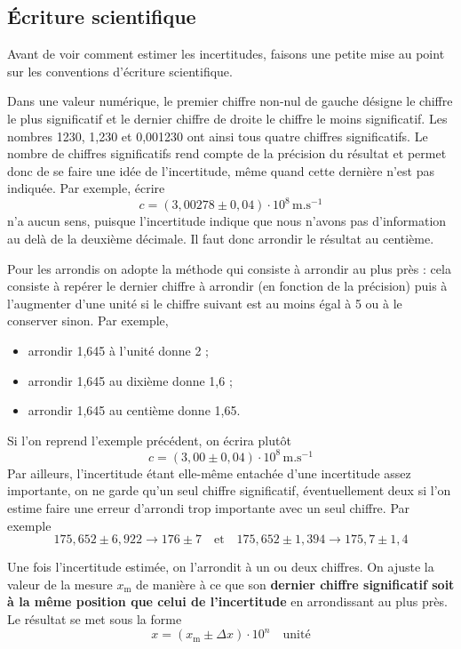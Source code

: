 \subsection{Écriture scientifique}%
Avant de voir comment estimer les incertitudes, faisons une petite mise au point sur les conventions d'écriture scientifique. 

Dans une valeur numérique, le premier chiffre non-nul de gauche désigne le chiffre le plus significatif et le dernier chiffre de droite le chiffre le moins significatif. Les nombres 1230, 1,230 et 0,001230 ont ainsi tous quatre chiffres significatifs. Le nombre de chiffres significatifs rend compte de la précision du résultat et permet donc de se faire une idée de l'incertitude, même quand cette dernière n'est pas indiquée. Par exemple, écrire	
\[
c = (3,00278\pm 0,04)\cdot 10^{8}\,\mathrm{m.s^{-1}}
\]
n'a aucun sens, puisque l'incertitude indique que nous n'avons pas d'information au delà de la deuxième décimale. Il faut donc arrondir le résultat au centième.
\begin{kaobox}[frametitle=Comment arrondir ?]
Pour les arrondis on adopte la méthode qui consiste à arrondir au plus près : cela consiste à repérer le dernier chiffre à arrondir (en fonction de la précision) puis à l'augmenter d'une unité si le chiffre suivant est au moins égal à 5 ou à le conserver sinon. Par exemple, 
\begin{itemize}
	\item arrondir 1,645 à l'unité donne 2 ;
	\item arrondir 1,645 au dixième donne 1,6 ;
	\item arrondir 1,645 au centième donne 1,65.
\end{itemize}
\end{kaobox}
Si l'on reprend l'exemple précédent, on écrira plutôt 
\[
c = (3,00\pm 0,04)\cdot 10^{8}\,\mathrm{m.s^{-1}}
\]
Par ailleurs, l'incertitude étant elle-même entachée d'une incertitude assez importante, on ne garde qu'un seul chiffre significatif, éventuellement deux si l'on estime faire une erreur d'arrondi trop importante avec un seul chiffre. Par exemple
\[	
175,652\pm 6,922\to176\pm7	\quad\text{et}\quad	175,652\pm 1,394\to175,7\pm1,4	
\]
\begin{kaobox}[frametitle=En résumé]
Une fois l'incertitude estimée, on l'arrondit à un ou deux chiffres. On ajuste la valeur de la mesure $x_\text{m}$ de manière à ce que son \textbf{dernier chiffre significatif soit à la même position que celui de l'incertitude} en arrondissant au plus près. Le résultat se met sous la forme 
\[
x=(x_\text{m}\pm\Delta x)\cdot 10^n\quad\text{unité}
\]
\end{kaobox}

